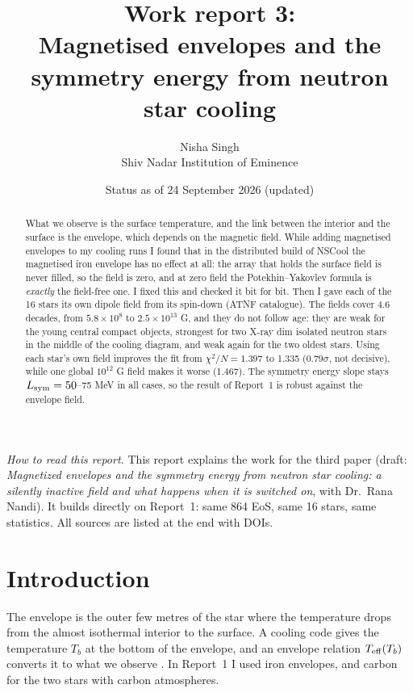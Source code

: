 \documentclass[11pt,a4paper]{article}
\title{Work report 3:\\ Magnetised envelopes and the symmetry energy from neutron star cooling}
\author{Nisha Singh\\ Shiv Nadar Institution of Eminence}
\date{Status as of 24 September 2026 (updated)}
\newcommand{\Lsym}{L_{\rm sym}}
\newcommand{\Teff}{T_{\rm eff}}
\begin{document}
\sloppy
\maketitle

\noindent\textit{How to read this report.} This report explains the work for the third paper (draft: \emph{Magnetized envelopes and the symmetry energy from neutron star cooling: a silently inactive field and what happens when it is switched on}, with Dr.~Rana Nandi). It builds directly on Report~1: same 864 EoS, same 16 stars, same statistics. All sources are listed at the end with DOIs.

\begin{abstract}
What we observe is the surface temperature, and the link between the interior and the surface is the envelope, which depends on the magnetic field. While adding magnetised envelopes to my cooling runs I found that in the distributed build of NSCool the magnetised iron envelope has no effect at all: the array that holds the surface field is never filled, so the field is zero, and at zero field the Potekhin--Yakovlev formula is \emph{exactly} the field-free one. I fixed this and checked it bit for bit. Then I gave each of the 16 stars its own dipole field from its spin-down (ATNF catalogue). The fields cover 4.6 decades, from $5.8\times10^8$ to $2.5\times10^{13}$ G, and they do not follow age: they are weak for the young central compact objects, strongest for two X-ray dim isolated neutron stars in the middle of the cooling diagram, and weak again for the two oldest stars. Using each star's own field improves the fit from $\chi^2/N=1.397$ to 1.335 ($0.79\sigma$, not decisive), while one global $10^{12}$ G field makes it worse (1.467). The symmetry energy slope stays $\Lsym=50$--75 MeV in all cases, so the result of Report~1 is robust against the envelope field.
\end{abstract}

\tableofcontents
\newpage

\section{Introduction}
The envelope is the outer few metres of the star where the temperature drops from the almost isothermal interior to the surface. A cooling code gives the temperature $T_b$ at the bottom of the envelope, and an envelope relation $\Teff(T_b)$ converts it to what we observe \cite{GPE1983,HernquistApplegate1984,PCY1997}. In Report~1 I used iron envelopes, and carbon for the two stars with carbon atmospheres.
\end{document}
